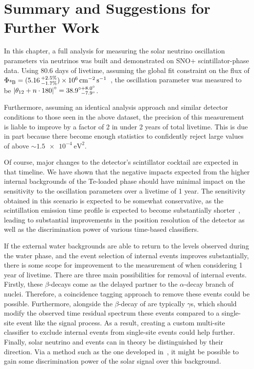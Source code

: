 \section{Summary and Suggestions for Further Work}
In this chapter, a full analysis for measuring the solar neutrino oscillation parameters via \beight{} neutrinos was built and demonstrated on SNO+ scintillator-phase data. Using 80.6 days of livetime, assuming the global fit constraint on the \beight{} flux of $\Phi_{\beight{}} = (5.16\,^{+2.5\%}_{-1.7\%})\times 10^{6}\,\si{\per\cm\squared\per\second}$~\cite{}, %
the oscillation parameter \tonetwo{} was measured to be $\left|\theta_{12}{} + n\cdot180\right|^{\circ} = 38.9^{\circ+8.0^{\circ}}_{\phantom{\circ}-7.9^{\circ}}$.

Furthermore, assuming an identical analysis approach and similar detector conditions to those seen in the above dataset, the precision of this measurement is liable to improve by a factor of 2 in under 2 years of total livetime. This is due in part because there become enough statistics to confidently reject large values of \dmsq{} above $\sim\SI{1.5e-4}{\eV\squared}$.

Of course, major changes to the detector's scintillator cocktail are expected in that timeline. We have shown that the negative impacts expected from the higher internal backgrounds of the Te-loaded phase should have minimal impact on the sensitivity to the oscillation parameters over a livetime of 1 year. The sensitivity obtained in this scenario is expected to be somewhat conservative, as the scintillation emission time profile is expected to become substantially shorter~\cite{}, %
leading to substantial improvements in the position resolution of the detector as well as the discrimination power of various time-based classifiers.

If the external water backgrounds are able to return to the levels observed during the water phase, and the event selection of internal  events improves substantially, there is some scope for improvement to the measurement of \tonetwo{} when considering 1 year of livetime. There are three main possibilities for removal of internal  events. Firstly, these $\beta$-decays come as the delayed partner to the $\alpha$-decay branch of  nuclei. Therefore, a coincidence tagging approach to remove these events could be possible. Furthermore, alongside the $\beta$-decay of  are typically $\gamma$s, which should modify the observed time residual spectrum these events compared to a single-site event like the signal process. As a result, creating a custom multi-site classifier to exclude internal  events from single-site events could help further. Finally, solar neutrino and  events can in theory be distinguished by their direction. Via a method such as the one developed in~\cite{}, %
it might be possible to gain some discrimination power of the solar signal over this background.

